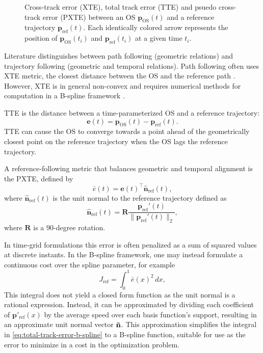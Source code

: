 \begin{figure}
    \centering
    
\caption{Cross-track error (XTE), total track error (TTE) and psuedo cross-track error (PXTE) between an OS $\mathbf p_\text{OS}(t)$ and a reference trajectory $\mathbf p_\text{ref}(t)$. Each identically colored arrow represents the position of $\mathbf p_\text{OS}(t_i)$ and $\mathbf p_\text{ref}(t_i)$ at a given time $t_i$.}
    \label{fig:cross-track-along-track-error}
\end{figure}

Literature distinguishes between path following (geometric relations) and trajectory following (geometric and temporal relations). Path following often uses \acrfull{XTE} metric, the closest distance between the OS and the reference path \citep{Fossen2011-Handbook}. However, XTE is in general non-convex and requires numerical methods for computation in a B-spline framework \citep{johnson2005distance,hu2005second,chen2009computing}.

\acrfull{TTE} is the distance between a time-parameterized OS and a reference trajectory:
\begin{equation}\label{eq:total-track-error}
    \mathbf e(t) = \mathbf p_\text{OS}(t) - \mathbf p_\text{ref}(t).
\end{equation}
TTE can cause the OS to converge towards a point ahead of the geometrically closest point on the reference trajectory when the OS lags the reference trajectory.


A reference‐following metric that balances geometric and temporal alignment is the \acrfull{PXTE}, defined by
\begin{equation}\label{eq:pxte}
  \bar e(t)
  = \mathbf e(t)^\top \mathbf{\hat n}_{\mathrm{ref}}(t),
\end{equation}
where $\mathbf{\hat n}_{\mathrm{ref}}(t)$ is the unit normal to the reference trajectory defined as 
\begin{equation}\label{eq:reference-normal-2}
    \mathbf{\hat n}_{\mathrm{ref}}(t) = \mathbf R\frac{\mathbf p_\text{ref}'(t)}{\|\mathbf p_\text{ref}'(t)\|_2},
\end{equation}
where $\mathbf R$ is a 90-degree rotation. 

In time‐grid formulations this error is often penalized as a sum of squared values at discrete instants. In the B‐spline framework, one may instead formulate a continuous cost over the spline parameter, for example
\begin{equation}\label{eq:total-track-error-b-spline}
J_\text{ref} = \int_0^1 \bar e(x)^2 \, dx,
\end{equation}
This integral does not yield a closed form function as the unit normal is a rational expression. Instead, it can be approximated by dividing each coefficient of $\mathbf p'_\text{ref}(x)$ by the average speed over each basis function's support, resulting in an approximate unit normal vector $\bf\tilde n$. This approximation simplifies the integral in \cref{eq:total-track-error-b-spline} to a B-spline function, suitable for use as the error to minimize in a cost in the optimization problem.


